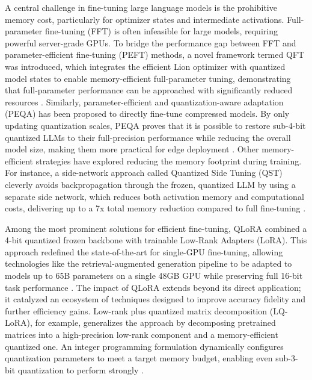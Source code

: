 \documentclass[11pt]{article}
\begin{document}
A central challenge in fine-tuning large language models is the prohibitive memory cost, particularly for optimizer states and intermediate activations. Full-parameter fine-tuning (FFT) is often infeasible for large models, requiring powerful server-grade GPUs. To bridge the performance gap between FFT and parameter-efficient fine-tuning (PEFT) methods, a novel framework termed QFT was introduced, which integrates the efficient Lion optimizer with quantized model states to enable memory-efficient full-parameter tuning, demonstrating that full-parameter performance can be approached with significantly reduced resources \cite{ref238}. Similarly, parameter-efficient and quantization-aware adaptation (PEQA) has been proposed to directly fine-tune compressed models. By only updating quantization scales, PEQA proves that it is possible to restore sub-4-bit quantized LLMs to their full-precision performance while reducing the overall model size, making them more practical for edge deployment \cite{ref226}. Other memory-efficient strategies have explored reducing the memory footprint during training. For instance, a side-network approach called Quantized Side Tuning (QST) cleverly avoids backpropagation through the frozen, quantized LLM by using a separate side network, which reduces both activation memory and computational costs, delivering up to a 7x total memory reduction compared to full fine-tuning \cite{ref239}.

Among the most prominent solutions for efficient fine-tuning, QLoRA combined a 4-bit quantized frozen backbone with trainable Low-Rank Adapters (LoRA). This approach redefined the state-of-the-art for single-GPU fine-tuning, allowing technologies like the retrieval-augmented generation pipeline to be adapted to models up to 65B parameters on a single 48GB GPU while preserving full 16-bit task performance \cite{ref240}. The impact of QLoRA extends beyond its direct application; it catalyzed an ecosystem of techniques designed to improve accuracy fidelity and further efficiency gains. Low-rank plus quantized matrix decomposition (LQ-LoRA), for example, generalizes the approach by decomposing pretrained matrices into a high-precision low-rank component and a memory-efficient quantized one. An integer programming formulation dynamically configures quantization parameters to meet a target memory budget, enabling even sub-3-bit quantization to perform strongly \cite{ref241}.
\end{document}

